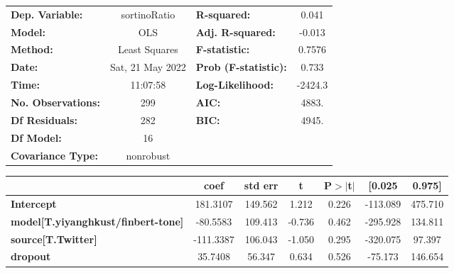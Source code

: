 \begin{center}
\begin{tabular}{lclc}
\toprule
\textbf{Dep. Variable:}                    &   sortinoRatio   & \textbf{  R-squared:         } &     0.041   \\
\textbf{Model:}                            &       OLS        & \textbf{  Adj. R-squared:    } &    -0.013   \\
\textbf{Method:}                           &  Least Squares   & \textbf{  F-statistic:       } &    0.7576   \\
\textbf{Date:}                             & Sat, 21 May 2022 & \textbf{  Prob (F-statistic):} &    0.733    \\
\textbf{Time:}                             &     11:07:58     & \textbf{  Log-Likelihood:    } &   -2424.3   \\
\textbf{No. Observations:}                 &         299      & \textbf{  AIC:               } &     4883.   \\
\textbf{Df Residuals:}                     &         282      & \textbf{  BIC:               } &     4945.   \\
\textbf{Df Model:}                         &          16      & \textbf{                     } &             \\
\textbf{Covariance Type:}                  &    nonrobust     & \textbf{                     } &             \\
\bottomrule
\end{tabular}
\begin{tabular}{lcccccc}
                                           & \textbf{coef} & \textbf{std err} & \textbf{t} & \textbf{P$> |$t$|$} & \textbf{[0.025} & \textbf{0.975]}  \\
\midrule
\textbf{Intercept}                         &     181.3107  &      149.562     &     1.212  &         0.226        &     -113.089    &      475.710     \\
\textbf{model[T.yiyanghkust/finbert-tone]} &     -80.5583  &      109.413     &    -0.736  &         0.462        &     -295.928    &      134.811     \\
\textbf{source[T.Twitter]}                 &    -111.3387  &      106.043     &    -1.050  &         0.295        &     -320.075    &       97.397     \\
\textbf{dropout}                           &      35.7408  &       56.347     &     0.634  &         0.526        &      -75.173    &      146.654     \\

\end{tabular}
\end{center}
